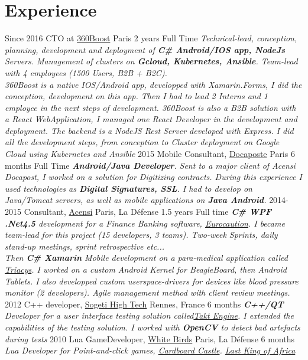 \documentclass{emonides-cv}
\begin{document}
\section{Experience}
\begin{entrylist}
  \entry
    {Since  2016}
    {CTO at \href{https://360boost.com/}{360Boost}  {\normalfont Paris}}
    {2 years Full Time}
    {\emph{Technical-lead, conception, planning, development and deployment of \textbf{C\# Android/IOS app, NodeJs} Servers.
     Management of clusters on \textbf{Gcloud, Kubernetes, Ansible}. Team-lead with 4 employees (1500 Users, B2B + B2C).
    \\360Boost is a native IOS/Android app, developped with Xamarin.Forms, I did the conception, development on this app.
    Then I had to lead 2 Interns and 1 employee in the next steps of development.
    360Boost is also a B2B solution with a React WebApplication, I managed one React Developer
    in the development and deployment.
    The backend is a NodeJS Rest Server developed with Express. I did all the development steps, from conception
    to Cluster deployment on Google Cloud using Kubernetes and Ansible}}
  \entry
    {2015}
    {Mobile Consultant, \href{https://www.docapost.com/en/}{Docaposte} {\normalfont Paris}}
    {6 months Full Time}
    {\emph{\textbf{Android/Java Developer}. Sent to a major client of Acensi Docapost, I worked on a solution for Digitizing contracts.
    During this experience I used technologies as \textbf{Digital Signatures, SSL}.
    I had to develop on Java/Tomcat servers, as well as mobile applications on \textbf{Java Android}.}}
  \entry
    {2014-2015}
    {Consultant, \href{https://www.acensi.fr/}{Acensi} {\normalfont Paris, La Défense}}
    {1.5 years Full time}
    {\emph{\textbf{C\# WPF .Net4.5} development for a Finance Banking software, \href{https://www.eurocaution.net/}{Eurocaution}.
    I became team-lead for this project (15 developers, 3 teams). Two-week Sprints, daily stand-up meetings, sprint retrospective etc...
    \\Then \textbf{C\# Xamarin} Mobile development on a para-medical application called \href{http://www.triacys.com/}{Triacys}.
    I worked on a custom Android Kernel for BeagleBoard, then Android Tablets. I also developped custom userspace-drivers for devices like blood pressure monitor
    (2 developers). Agile management method with client review meetings. }}
  \entry
    {2012}
    {C++ developer, \href{https://www.acensi.fr/}{Sogeti High Tech} {\normalfont Rennes, France}}
    {6 months}
    {\emph{\textbf{C++/QT} Developer for a user interface testing solution called\href{https://www.eurocaution.net/}{Takt Engine}.
    I extended the capabilities of the testing solution. I worked with \textbf{OpenCV} to detect bad artefacts during tests }}
  \entry
    {2010}
    {Lua GameDeveloper, \href{https://www.giantbomb.com/white-birds-productions/3010-5637/}{White Birds} {\normalfont Paris, La Défense}}
    {6 months}
    {\emph{Lua Developer for Point-and-click games, \href{https://www.bigfishgames.com/games/6859/cardboard-castle/}{Cardboard Castle}. \href{https://www.wikiwand.com/fr/White_Birds_Productions}{Last King of Africa}}}
\end{entrylist}
\end{document}
